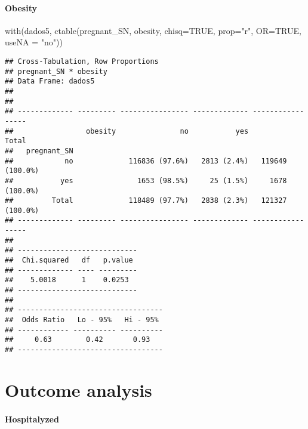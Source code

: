 \documentclass[
]{article}
\newenvironment{Shaded}{\begin{snugshade}}{\end{snugshade}}
\newcommand{\AttributeTok}[1]{\textcolor[rgb]{0.77,0.63,0.00}{#1}}
\newcommand{\ConstantTok}[1]{\textcolor[rgb]{0.00,0.00,0.00}{#1}}
\newcommand{\FunctionTok}[1]{\textcolor[rgb]{0.00,0.00,0.00}{#1}}
\newcommand{\NormalTok}[1]{#1}
\newcommand{\StringTok}[1]{\textcolor[rgb]{0.31,0.60,0.02}{#1}}
\begin{document}
\hypertarget{obesity}{%
\paragraph{\texorpdfstring{{ Obesity }}{ Obesity }}\label{obesity}}

\begin{Shaded}
\begin{Highlighting}[]
\FunctionTok{with}\NormalTok{(dados5, }\FunctionTok{ctable}\NormalTok{(pregnant\_SN, obesity, }\AttributeTok{chisq=}\ConstantTok{TRUE}\NormalTok{, }\AttributeTok{prop=}\StringTok{"r"}\NormalTok{, }\AttributeTok{OR=}\ConstantTok{TRUE}\NormalTok{, }\AttributeTok{useNA =} \StringTok{"no"}\NormalTok{))}
\end{Highlighting}
\end{Shaded}

\begin{verbatim}
## Cross-Tabulation, Row Proportions  
## pregnant_SN * obesity  
## Data Frame: dados5  
## 
## 
## ------------- --------- ---------------- ------------- -----------------
##                 obesity               no           yes             Total
##   pregnant_SN                                                           
##            no             116836 (97.6%)   2813 (2.4%)   119649 (100.0%)
##           yes               1653 (98.5%)     25 (1.5%)     1678 (100.0%)
##         Total             118489 (97.7%)   2838 (2.3%)   121327 (100.0%)
## ------------- --------- ---------------- ------------- -----------------
## 
## ----------------------------
##  Chi.squared   df   p.value 
## ------------- ---- ---------
##    5.0018      1    0.0253  
## ----------------------------
## 
## ----------------------------------
##  Odds Ratio   Lo - 95%   Hi - 95% 
## ------------ ---------- ----------
##     0.63        0.42       0.93   
## ----------------------------------
\end{verbatim}

\hypertarget{outcome-analysis}{%
\section{Outcome analysis}\label{outcome-analysis}}

\hypertarget{hospitalyzed}{%
\paragraph{\texorpdfstring{{ Hospitalyzed
}}{ Hospitalyzed }}\label{hospitalyzed}}
\end{document}
